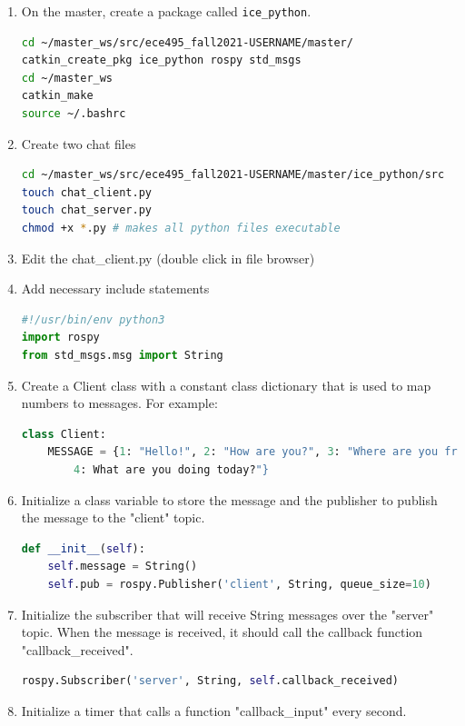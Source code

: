 \documentclass{handout}
\begin{document}
\begin{enumerate}
	\item On the master, create a package called \texttt{ice\_python}.
	
\begin{lstlisting}[language=bash]
cd ~/master_ws/src/ece495_fall2021-USERNAME/master/
catkin_create_pkg ice_python rospy std_msgs
cd ~/master_ws
catkin_make
source ~/.bashrc
\end{lstlisting}

	\item Create two chat files
\begin{lstlisting}[language=bash]
cd ~/master_ws/src/ece495_fall2021-USERNAME/master/ice_python/src
touch chat_client.py
touch chat_server.py
chmod +x *.py # makes all python files executable
\end{lstlisting}
	\item Edit the chat\_client.py (double click in file browser)
	\item Add necessary include statements
\begin{lstlisting}[language=python]
#!/usr/bin/env python3
import rospy
from std_msgs.msg import String
\end{lstlisting}
	\item Create a Client class with a constant class dictionary that is used to map numbers to messages. For example:
\begin{lstlisting}[language=python]
class Client:
    MESSAGE = {1: "Hello!", 2: "How are you?", 3: "Where are you from?", 
        4: What are you doing today?"}
\end{lstlisting}
	\item Initialize a class variable to store the message and the publisher to publish the message to the "client" topic.
\begin{lstlisting}[language=python]
def __init__(self):
    self.message = String()
    self.pub = rospy.Publisher('client', String, queue_size=10)
\end{lstlisting}
	\item Initialize the subscriber that will receive String messages over the "server" topic. When the message is received, it should call the callback function "callback\_received".
\begin{lstlisting}[language=python]
rospy.Subscriber('server', String, self.callback_received)
\end{lstlisting}
	\item Initialize a timer that calls a function "callback\_input" every second.

\end{enumerate}
\end{document}
